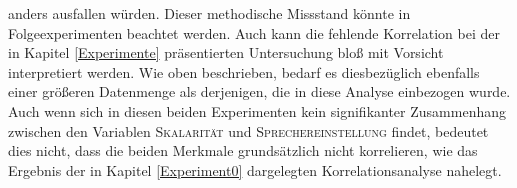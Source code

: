 anders ausfallen würden. Dieser methodische Missstand könnte in Folgeexperimenten beachtet werden. Auch kann die fehlende Korrelation bei der in Kapitel \ref{Experimente} präsentierten Untersuchung bloß mit Vorsicht interpretiert werden. Wie oben beschrieben, bedarf es diesbezüglich ebenfalls einer größeren Datenmenge als derjenigen, die in diese Analyse einbezogen wurde. Auch wenn sich in diesen beiden Experimenten kein signifikanter Zusammenhang zwischen den Variablen \textsc{Skalarität} und \textsc{Sprechereinstellung} findet, bedeutet dies nicht, dass die beiden Merkmale grundsätzlich nicht korrelieren, wie das Ergebnis der in Kapitel \ref{Experiment0} dargelegten Korrelationsanalyse nahelegt.










